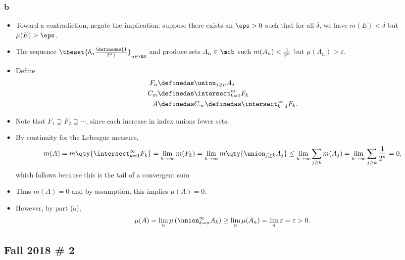 \begin{solution}
\hypertarget{b-7}{%
\subsubsection{b}\label{b-7}}

\begin{itemize}
\item
  Toward a contradiction, negate the implication: suppose there exists
  an \(\eps>0\) such that for all \(\delta\), we have \(m(E) < \delta\)
  but \(\mu(E) > \eps\).
\item
  The sequence \(\theset{\delta_n \definedas {1\over 2^n}}_{n\in \NN}\)
  and produce sets \(A_n\in \mcb\) such \(m(A_n) < {1\over 2^n}\) but
  \(\mu(A_n) > \varepsilon\).
\item
  Define
  \begin{align*}
  F_n &\definedas \union_{j\geq n} A_j \\
  C_m &\definedas \intersect_{k=1}^m F_k \\
  A &\definedas C_\infty \definedas \intersect_{k=1}^\infty F_k 
  .\end{align*}
\item
  Note that \(F_1 \supseteq F_2 \supseteq \cdots\), since each increase
  in index unions fewer sets.
\item
  By continuity for the Lebesgue measure,
  \begin{align*}
  m(A) 
  = m \qty{\intersect_{k=1}^\infty F_k }
  = \lim_{k\to \infty} m (F_k) 
  = \lim_{k\to\infty} m\qty{\union_{j\geq k} A_j } 
  \leq \lim_{k\to\infty} \sum_{j\geq k} m(A_j) 
  = \lim_{k\to\infty} \sum_{j\geq k} {1\over 2^n} 
  = 0
  ,\end{align*} which follows because this is the tail of a convergent
  sum
\item
  Thus \(m(A) = 0\) and by assumption, this implies \(\mu(A) = 0\).
\item
  However, by part (a),
  \begin{align*}
  \mu(A) = \lim_n \mu\left( \union_{k=n}^\infty A_k \right)
  \geq \lim_n \mu(A_n) = \lim_n \varepsilon = \varepsilon > 0
  .\end{align*}
\end{itemize}

\end{solution}


\hypertarget{fall-2018-2}{%
\subsection{Fall 2018 \# 2}\label{fall-2018-2}}

